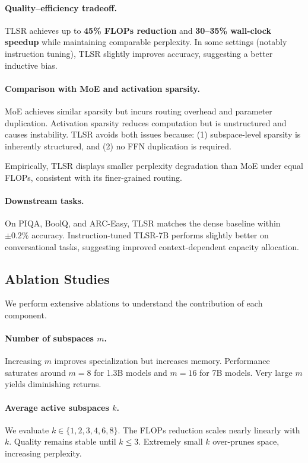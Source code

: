 \documentclass{article}
\theoremstyle{plain}
\theoremstyle{definition}
\theoremstyle{remark}
\begin{document}
\paragraph{Quality--efficiency tradeoff.}
TLSR achieves up to \textbf{45\% FLOPs reduction} and
\textbf{30--35\% wall-clock speedup}
while maintaining comparable perplexity.
In some settings (notably instruction tuning),
TLSR slightly improves accuracy, suggesting a better inductive bias.

\paragraph{Comparison with MoE and activation sparsity.}
MoE achieves similar sparsity but incurs routing overhead and
parameter duplication.
Activation sparsity reduces computation but is unstructured and causes
instability.
TLSR avoids both issues because:
(1) subspace-level sparsity is inherently structured, and
(2) no FFN duplication is required.

Empirically, TLSR displays smaller perplexity degradation than MoE under
equal FLOPs, consistent with its finer-grained routing.

\paragraph{Downstream tasks.}
On PIQA, BoolQ, and ARC-Easy, TLSR matches the dense baseline within
$\pm0.2\%$ accuracy.
Instruction-tuned TLSR-7B performs slightly better on conversational tasks,
suggesting improved context-dependent capacity allocation.

\subsection{Ablation Studies}

We perform extensive ablations to understand the contribution of each
component.

\paragraph{Number of subspaces $m$.}
Increasing $m$ improves specialization but increases memory.
Performance saturates around $m=8$ for 1.3B models and $m=16$ for 7B models.
Very large $m$ yields diminishing returns.

\paragraph{Average active subspaces $k$.}
We evaluate $k \in \{1,2,3,4,6,8\}$.
The FLOPs reduction scales nearly linearly with $k$.
Quality remains stable until $k \le 3$.
Extremely small $k$ over-prunes space, increasing perplexity.
\end{document}

